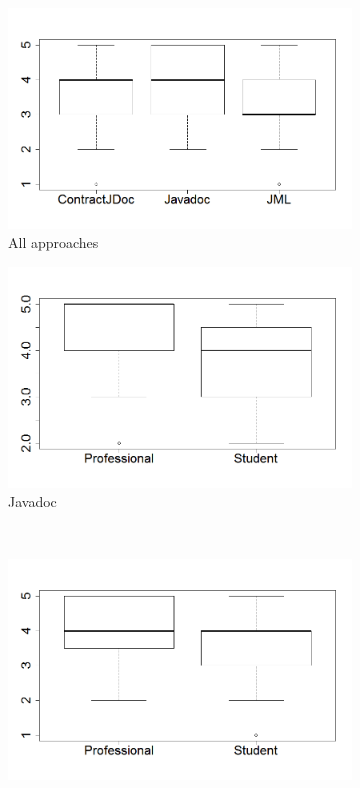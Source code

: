 \begin{figure}
\centering
\begin{subfigure}{.48\textwidth}
\includegraphics[width=1\linewidth]{figs/boxplotApproachesSurveyStudy}
\caption{All approaches}
\label{fig:allApproaches}
\end{subfigure}
\begin{subfigure}{.48\textwidth}
\includegraphics[width=1\linewidth]{figs/boxPlotJavadocXExperience}
\caption{Javadoc}
\label{fig:javadocExp}
\end{subfigure}
\\[1ex]
\begin{subfigure}{.48\textwidth}
\includegraphics[width=1\linewidth]{figs/boxplotContractJDocXExperience.png}

\end{subfigure}
\end{figure}
